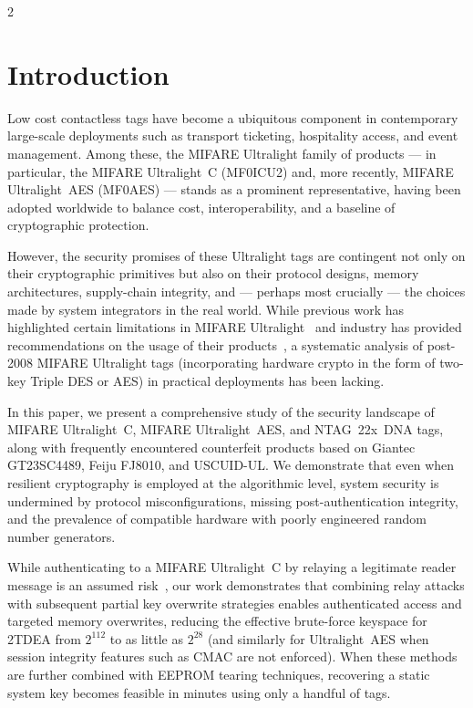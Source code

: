 \documentclass[10pt,letterpaper]{article}
\begin{document}
\begin{multicols}{2}
\section{Introduction}
Low cost contactless tags have become a ubiquitous component in contemporary large-scale deployments such as transport ticketing, hospitality access, and event management. Among these, the MIFARE Ultralight family of products --- in particular, the MIFARE Ultralight~C (MF0ICU2) and, more recently, MIFARE Ultralight~AES (MF0AES) --- stands as a prominent representative, having been adopted worldwide to balance cost, interoperability, and a baseline of cryptographic protection.

However, the security promises of these Ultralight tags are contingent not only on their cryptographic primitives but also on their protocol designs, memory architectures, supply-chain integrity, and --- perhaps most crucially --- the choices made by system integrators in the real world. While previous work has highlighted certain limitations in MIFARE Ultralight~\cite{beccaro_otp_mifare_ultralight_2013, grisolia_ukmar_eeprom_2020, teuwen2021eeprom} and industry has provided recommendations on the usage of their products~\cite{nxp_an12265, nxp_an13452}, a systematic analysis of post-2008 MIFARE Ultralight tags (incorporating hardware crypto in the form of two-key Triple DES or AES) in practical deployments has been lacking.

In this paper, we present a comprehensive study of the security landscape of MIFARE Ultralight~C, MIFARE Ultralight~AES, and NTAG~22x~DNA tags, along with frequently encountered counterfeit products based on Giantec GT23SC4489, Feiju FJ8010, and USCUID-UL. We demonstrate that even when resilient cryptography is employed at the algorithmic level, system security is undermined by protocol misconfigurations, missing post-authentication integrity, and the prevalence of compatible hardware with poorly engineered random number generators.

While authenticating to a MIFARE Ultralight~C by relaying a legitimate reader message is an assumed risk~\cite{nxp_an12265}, our work demonstrates that combining relay attacks with subsequent partial key overwrite strategies enables authenticated access and targeted memory overwrites, reducing the effective brute-force keyspace for 2TDEA from $2^{112}$ to as little as $2^{28}$ (and similarly for Ultralight~AES when session integrity features such as CMAC are not enforced). When these methods are further combined with EEPROM tearing techniques, recovering a static system key becomes feasible in minutes using only a handful of tags.


\end{multicols}
\end{document}
